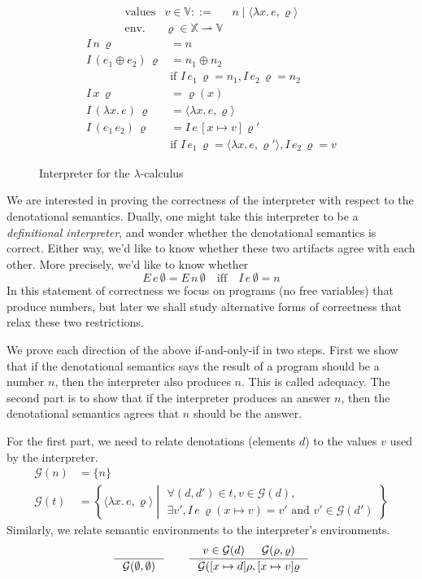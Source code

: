 \documentclass{tufte-handout}
\newcommand{\LAM}[1]{\lambda #1.\,}
\newcommand{\pto}[0]{\rightharpoonup}
\newcommand{\VAR}[0]{\mathbb{X}}
\newcommand{\ext}[3]{#3(#1{\mapsto}#2)}
\begin{document}
\begin{figure}[tbp]
\[
\begin{array}{lrl}
 \text{values} & v \in \mathbb{V} ::= & n \mid \langle \LAM{x}e, \varrho \rangle \\
 \text{env.} & \varrho \in \VAR \pto \mathbb{V} 
\end{array}
\]
\begin{align*}
  I\,n\,\varrho &= n \\
  I\,(e_1 \oplus e_2)\,\varrho &= n_1 \oplus n_2 \\
      & \text{if } I\,e_1\,\varrho = n_1, I\,e_2\,\varrho = n_2 \\
  I\,x\,\varrho &= \varrho(x) \\
  I\,(\LAM{x}e)\,\varrho &= \langle \LAM{x}e, \varrho \rangle \\
  I\,(e_1\,e_2)\,\varrho &=  I\,e\,[x\mapsto v]\varrho'\\
  & \text{if } I\,e_1\,\varrho = \langle \LAM{x}e,\varrho' \rangle,
      I\,e_2\,\varrho = v
\end{align*}

\caption{Interpreter for the $\lambda$-calculus}
\label{fig:interp-lambda}
\end{figure}

We are interested in proving the correctness of the interpreter with
respect to the denotational semantics. Dually, one might take this
interpreter to be a \emph{definitional interpreter}, and wonder
whether the denotational semantics is correct. Either way, we'd like
to know whether these two artifacts agree with each other.
More precisely, we'd like to know whether
\[
    E\,e\,\emptyset = E\,n\,\emptyset \quad\text{iff}\quad I\,e\,\emptyset = n
\]
In this statement of correctness we focus on programs (no free
variables) that produce numbers, but later we shall study alternative
forms of correctness that relax these two restrictions.

We prove each direction of the above if-and-only-if in two steps.
First we show that if the denotational semantics says the result of a
program should be a number $n$, then the interpreter also produces
$n$. This is called adequacy. The second part is to show that if the
interpreter produces an answer $n$, then the denotational semantics
agrees that $n$ should be the answer. 

For the first part, we need to relate denotations (elements $d$) to
the values $v$ used by the interpreter.
\begin{align*}
  \mathcal{G}(n) &= \{ n \} \\
  \mathcal{G}(t) &= \left\{ \langle \LAM{x} e, \varrho \rangle \middle|
     \begin{array}{l}
       \forall (d,d') \in t, v \in \mathcal{G}(d),\\
       \exists v', I\,e\,\ext{x}{v}{\varrho} = v'
               \text{ and } v'\in\mathcal{G}(d')
     \end{array} \right\}
\end{align*}
Similarly, we relate semantic environments to the
interpreter's environments.
\[
  \inference{}{\mathcal{G}(\emptyset,\emptyset)}
  \qquad
  \inference{v \in \mathcal{G}(d) & \mathcal{G}(\rho,\varrho)}
            {\mathcal{G}([x\mapsto d] \rho, [x\mapsto v] \varrho}
\]
\end{document}

